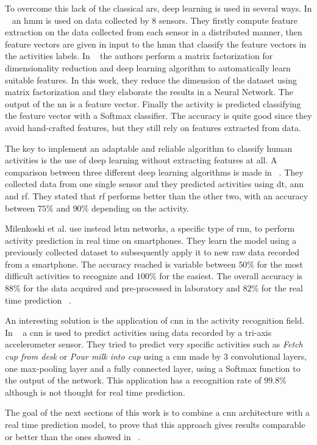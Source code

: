 To overcome this lack of the classical \gls{ars}, deep learning is used in several ways.
In ~\cite{Guenterberg09} an \gls{hmm} is used on data collected by 8 sensors. They firstly compute feature extraction on the data collected from each sensor in a distributed manner, then feature vectors are given in input to the \gls{hmm} that classify the feature vectors in the activities labels.
In ~\cite{Chikhaoui17} the authors perform a matrix factorization for dimensionality reduction and deep learning algorithm to automatically learn suitable features.
In this work, they reduce the dimension of the dataset using matrix factorization and they elaborate the results in a Neural Network. The output of the \gls{nn} is a feature vector. Finally the activity is predicted classifying the feature vector with a Softmax classifier.
The accuracy is quite good since they avoid hand-crafted features, but they still rely on features extracted from data.

The key to implement an adaptable and reliable algorithm to classify human activities is the use of deep learning without extracting features at all.
A comparison between three different deep learning algorithms is made in ~\cite{Xu2017}. They collected data from one single sensor and they predicted activities using \gls{dt}, \gls{ann} and \gls{rf}. They stated that \gls{rf} performs better than the other two, with an accuracy between $75 \%$ and $90 \%$ depending on the activity.

Milenkoski et al. use instead \gls{lstm} networks, a specific type of \gls{rnn}, to perform activity prediction in real time on smartphones.
They learn the model using a previously collected dataset to subsequently apply it to new raw data recorded from a smartphone. The accuracy reached is variable between $50\%$ for the most difficult activities to recognize and $100\%$ for the easiest. The overall accuracy is $88\%$ for the data acquired and pre-processed in laboratory  and $82\%$ for the real time prediction ~\cite{Milenkoski18}.

An interesting solution is the application of \gls{cnn} in the activity recognition field.
In ~\cite{Panwar17} a \gls{cnn} is used to predict activities using data recorded by a tri-axis accelerometer sensor. They tried to predict very specific activities such as \textit{Fetch cup from desk} or \textit{Pour milk into cup} using a \gls{cnn} made by 3 convolutional layers, one max-pooling layer and a fully connected layer, using a Softmax function to the output of the network.
This application has a recognition rate of $99.8\%$ although is not thought for real time prediction.

The goal of the next sections of this work is to combine a \gls{cnn} architecture with a real time prediction model, to prove that this approach gives results comparable or better than the ones showed in ~\cite{Korbinian}.